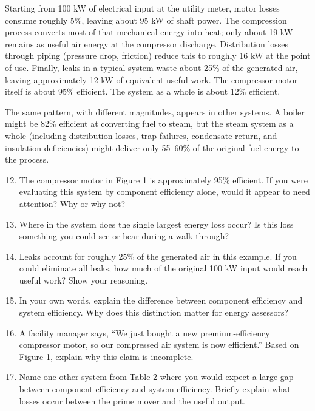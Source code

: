 \documentclass[./main.tex]{subfiles}
\begin{document}
Starting from 100 kW of electrical input at the utility meter, motor losses
consume roughly 5\%, leaving about 95 kW of shaft power. The compression
process converts most of that mechanical energy into heat; only about 19 kW
remains as useful air energy at the compressor discharge. Distribution losses
through piping (pressure drop, friction) reduce this to roughly 16 kW at the
point of use. Finally, leaks in a typical system waste about 25\% of the
generated air, leaving approximately 12 kW of equivalent useful work. The
compressor motor itself is about 95\% efficient. The system as a whole is about
12\% efficient.

The same pattern, with different magnitudes, appears in other systems. A boiler
might be 82\% efficient at converting fuel to steam, but the steam system as a
whole (including distribution losses, trap failures, condensate return, and
insulation deficiencies) might deliver only 55--60\% of the original fuel
energy to the process.

\begin{enumerate}
  \setcounter{enumi}{11}
  \item The compressor motor in Figure 1 is approximately 95\% efficient. If
        you were evaluating this system by component efficiency alone, would it
        appear to need attention? Why or why not?
        \vspace{1.25in}

  \item Where in the system does the single largest energy loss occur? Is this
        loss something you could see or hear during a walk-through?
        \vspace{1.25in}

  \item Leaks account for roughly 25\% of the generated air in this example.
        If you could eliminate all leaks, how much of the original 100 kW
        input would reach useful work? Show your reasoning.
        \vspace{1.25in}

  \item In your own words, explain the difference between component efficiency
        and system efficiency. Why does this distinction matter for energy
        assessors?
        \vspace{1.25in}

  \item A facility manager says, ``We just bought a new premium-efficiency
        compressor motor, so our compressed air system is now efficient.''
        Based on Figure 1, explain why this claim is incomplete.
        \vspace{1.25in}

  \item Name one other system from Table 2 where you would expect a large gap
        between component efficiency and system efficiency. Briefly explain
        what losses occur between the prime mover and the useful output.
        \vspace{1.25in}
\end{enumerate}
\end{document}
